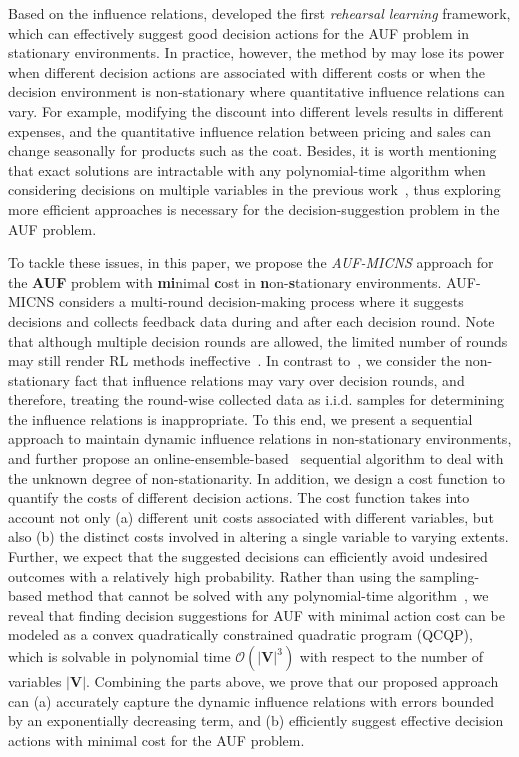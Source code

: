 \documentclass{article}
\theoremstyle{plain}
\theoremstyle{definition}
\theoremstyle{remark}
\def \V {\mathbf{V}}
\def \V {\mathbf{V}}
\begin{document}
Based on the influence relations, \citet{qint2023srm} developed the first \textit{rehearsal learning} framework, 
which can effectively suggest good decision actions for the AUF problem in stationary environments. 
In practice, however, the method by \citet{qint2023srm} may lose its power 
when different decision actions are associated with different costs 
or when the decision environment is non-stationary where quantitative influence relations can vary. 
For example, modifying the discount into different levels results in different expenses, and the quantitative influence relation between pricing and sales can change seasonally for products such as the coat. 
Besides, it is worth mentioning that exact solutions are intractable with any polynomial-time algorithm when considering decisions on multiple variables in the previous work~\citep{qint2023srm}, thus exploring more efficient approaches is necessary for the decision-suggestion problem in the AUF problem. 

To tackle these issues, in this paper, we propose the \textit{AUF-MICNS} approach for the \textbf{AUF} problem with \textbf{mi}nimal \textbf{c}ost in \textbf{n}on-\textbf{s}tationary environments. 
AUF-MICNS considers a multi-round decision-making process where it suggests decisions and collects feedback data during and after each decision round. 
Note that although multiple decision rounds are allowed, the limited number of rounds may still render RL methods ineffective~\citep{qint2023srm}. 
In contrast to~\citet{qint2023srm}, we consider the non-stationary fact that influence relations may vary over decision rounds, and therefore, treating the round-wise collected data as i.i.d. samples for determining the influence relations is inappropriate. 
To this end, we present a sequential approach to maintain dynamic influence relations in non-stationary environments, and further propose an online-ensemble-based~\citep{zhao2024adaptivity} sequential algorithm to deal with the unknown degree of non-stationarity. 
In addition, we design a cost function to quantify the costs of different decision actions. 
The cost function takes into account not only (a) different unit costs associated with different variables, but also (b) the distinct costs involved in altering a single variable to varying extents. 
Further, we expect that the suggested decisions can efficiently avoid undesired outcomes with a relatively high probability. 
Rather than using the sampling-based method that cannot be solved with any polynomial-time algorithm~\citep{qint2023srm}, we reveal that finding decision suggestions for AUF with minimal action cost can be modeled as a convex quadratically constrained quadratic program (QCQP), which is solvable in polynomial time $\mathcal{O}(|\V|^3)$ with respect to the number of variables $|\V|$. 
Combining the parts above, we prove that our proposed approach can 
(a) accurately capture the dynamic influence relations with errors bounded by an exponentially decreasing term, and 
(b) efficiently suggest effective decision actions with minimal cost for the AUF problem.
\end{document}
